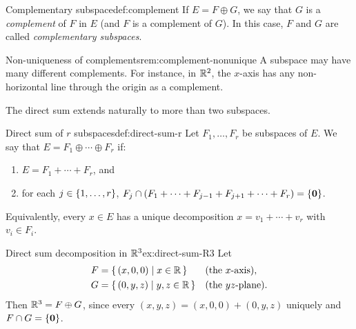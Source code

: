 \begin{definition}{Complementary subspace}{def:complement}
If $E = F\oplus G$, we say that $G$ is a \emph{complement} of $F$ in
$E$ (and $F$ is a complement of $G$). In this case, $F$ and $G$ are
called \emph{complementary subspaces}.
\end{definition}

\begin{remark}{Non-uniqueness of complements}{rem:complement-nonunique}
A subspace may have many different complements. For instance, in ${\mathbb{R}}^2$,
the $x$-axis has any non-horizontal line through the origin as a
complement.
\end{remark}

The direct sum extends naturally to more than two subspaces.

\begin{definition}{Direct sum of $r$ subspaces}{def:direct-sum-r}
Let $F_1,\ldots,F_r$ be subspaces of $E$. We say that
$E = F_1\oplus\cdots\oplus F_r$ if:
\begin{enumerate}[label=(\roman*)]
  \item $E = F_1 + \cdots + F_r$, and
  \item for each $j\in\left\{1,\ldots,r\right\}$,
    $F_j \cap (F_1+\cdots+F_{j-1}+F_{j+1}+\cdots+F_r) = \left\{\mathbf{0}\right\}$.
\end{enumerate}
Equivalently, every $x\in E$ has a unique decomposition
$x = v_1 + \cdots + v_r$ with $v_i\in F_i$.
\end{definition}

\begin{example}{Direct sum decomposition in ${\mathbb{R}}^3$}{ex:direct-sum-R3}
Let
\begin{align*}
  F &= \left\{\,(x,0,0)\;\middle|\;x\in{\mathbb{R}}\,\right\} &&\text{(the $x$-axis)}, \\
  G &= \left\{\,(0,y,z)\;\middle|\;y,z\in{\mathbb{R}}\,\right\} &&\text{(the $yz$-plane)}.
\end{align*}
Then ${\mathbb{R}}^3 = F\oplus G$, since every $(x,y,z) = (x,0,0)+(0,y,z)$
uniquely and $F\cap G = \left\{\mathbf{0}\right\}$.
\end{example}

